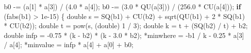 \documentclass[
  12pt,
  letterpaper,
  DIV=11,
  numbers=noendperiod]{scrreprt}
\newenvironment{Shaded}{\begin{snugshade}}{\end{snugshade}}
\newcommand{\ControlFlowTok}[1]{\textcolor[rgb]{0.00,0.23,0.31}{\textbf{#1}}}
\newcommand{\DataTypeTok}[1]{\textcolor[rgb]{0.68,0.00,0.00}{#1}}
\newcommand{\DecValTok}[1]{\textcolor[rgb]{0.68,0.00,0.00}{#1}}
\newcommand{\FloatTok}[1]{\textcolor[rgb]{0.68,0.00,0.00}{#1}}
\newcommand{\NormalTok}[1]{\textcolor[rgb]{0.00,0.23,0.31}{#1}}
\newcommand{\OperatorTok}[1]{\textcolor[rgb]{0.37,0.37,0.37}{#1}}
\theoremstyle{remark}
\begin{document}
\begin{Shaded}
\begin{Highlighting}[]
\NormalTok{    b0 }\OperatorTok{{-}=} \OperatorTok{(}\NormalTok{a}\OperatorTok{[}\DecValTok{1}\OperatorTok{]} \OperatorTok{*}\NormalTok{ a}\OperatorTok{[}\DecValTok{3}\OperatorTok{])} \OperatorTok{/} \OperatorTok{(}\FloatTok{4.0} \OperatorTok{*}\NormalTok{ a}\OperatorTok{[}\DecValTok{4}\OperatorTok{]);}
\NormalTok{    b0 }\OperatorTok{{-}=} \OperatorTok{(}\FloatTok{3.0} \OperatorTok{*}\NormalTok{ QU}\OperatorTok{(}\NormalTok{a}\OperatorTok{[}\DecValTok{3}\OperatorTok{]))} \OperatorTok{/} \OperatorTok{(}\FloatTok{256.0} \OperatorTok{*}\NormalTok{ CU}\OperatorTok{(}\NormalTok{a}\OperatorTok{[}\DecValTok{4}\OperatorTok{]));}
    \ControlFlowTok{if} \OperatorTok{(}\NormalTok{fabs}\OperatorTok{(}\NormalTok{b1}\OperatorTok{)} \OperatorTok{\textgreater{}} \FloatTok{1e{-}15}\OperatorTok{)} \OperatorTok{\{}
        \DataTypeTok{double}\NormalTok{ s }\OperatorTok{=}\NormalTok{ SQ}\OperatorTok{(}\NormalTok{b1}\OperatorTok{)} \OperatorTok{+}\NormalTok{ CU}\OperatorTok{(}\NormalTok{b2}\OperatorTok{)} \OperatorTok{+}\NormalTok{ sqrt}\OperatorTok{(}\NormalTok{QU}\OperatorTok{(}\NormalTok{b1}\OperatorTok{)} \OperatorTok{+} \DecValTok{2} \OperatorTok{*}\NormalTok{ SQ}\OperatorTok{(}\NormalTok{b1}\OperatorTok{)} \OperatorTok{*}\NormalTok{ CU}\OperatorTok{(}\NormalTok{b2}\OperatorTok{));}
        \DataTypeTok{double}\NormalTok{ t }\OperatorTok{=}\NormalTok{ pow}\OperatorTok{(}\NormalTok{s}\OperatorTok{,} \OperatorTok{(}\DataTypeTok{double}\OperatorTok{)} \DecValTok{1} \OperatorTok{/} \DecValTok{3}\OperatorTok{);}
        \DataTypeTok{double}\NormalTok{ k }\OperatorTok{=}\NormalTok{ t }\OperatorTok{+} \OperatorTok{(}\NormalTok{SQ}\OperatorTok{(}\NormalTok{b2}\OperatorTok{)} \OperatorTok{/}\NormalTok{ t}\OperatorTok{)} \OperatorTok{+}\NormalTok{ b2}\OperatorTok{;}
        \DataTypeTok{double}\NormalTok{ infp }\OperatorTok{=} \OperatorTok{{-}}\FloatTok{0.75} \OperatorTok{*} \OperatorTok{(}\NormalTok{k }\OperatorTok{{-}}\NormalTok{ b2}\OperatorTok{)} \OperatorTok{*} \OperatorTok{(}\NormalTok{k }\OperatorTok{{-}} \FloatTok{3.0} \OperatorTok{*}\NormalTok{ b2}\OperatorTok{);}
        \OperatorTok{*}\NormalTok{minwhere }\OperatorTok{=} \OperatorTok{{-}}\NormalTok{b1 }\OperatorTok{/}\NormalTok{ k }\OperatorTok{{-}} \FloatTok{0.25} \OperatorTok{*}\NormalTok{ a}\OperatorTok{[}\DecValTok{3}\OperatorTok{]} \OperatorTok{/}\NormalTok{ a}\OperatorTok{[}\DecValTok{4}\OperatorTok{];}
        \OperatorTok{*}\NormalTok{minvalue }\OperatorTok{=}\NormalTok{ infp }\OperatorTok{*}\NormalTok{ a}\OperatorTok{[}\DecValTok{4}\OperatorTok{]} \OperatorTok{+}\NormalTok{ a}\OperatorTok{[}\DecValTok{0}\OperatorTok{]} \OperatorTok{+}\NormalTok{ b0}\OperatorTok{;}

\end{Highlighting}
\end{Shaded}
\end{document}
